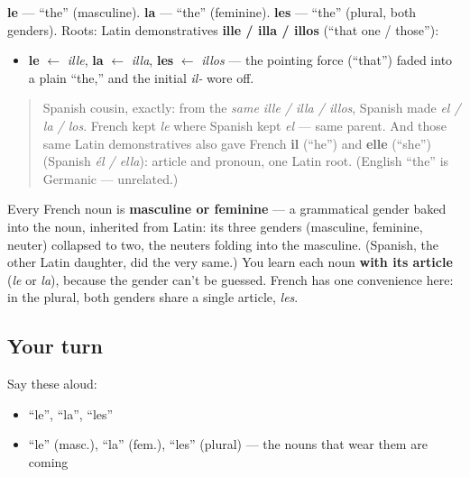 \begin{cousinweb}
\textbf{le} — \textquotedblleft{}the\textquotedblright{} (masculine). \textbf{la} — \textquotedblleft{}the\textquotedblright{} (feminine). \textbf{les} — \textquotedblleft{}the\textquotedblright{} (plural, both genders). Roots: Latin demonstratives \textbf{ille / illa / illos} (\textquotedblleft{}that one / those\textquotedblright{}):

\begin{itemize}
\raggedright
  \item \textbf{le} $\leftarrow$ \emph{ille}, \textbf{la} $\leftarrow$ \emph{illa}, \textbf{les} $\leftarrow$ \emph{illos} — the pointing force (\textquotedblleft{}that\textquotedblright{}) faded into a plain \textquotedblleft{}the,\textquotedblright{} and the initial \emph{il-} wore off.
\end{itemize}

\begin{quote}
Spanish cousin, exactly: from the \emph{same ille / illa / illos}, Spanish made \emph{el / la / los}. French kept \emph{le} where Spanish kept \emph{el} — same parent. And those same Latin demonstratives also gave French \textbf{il} (\textquotedblleft{}he\textquotedblright{}) and \textbf{elle} (\textquotedblleft{}she\textquotedblright{}) (Spanish \emph{él / ella}): article and pronoun, one Latin root. (English \textquotedblleft{}the\textquotedblright{} is Germanic — unrelated.)
\end{quote}
\end{cousinweb}

\begin{grammarlens}[title={Grammar Lens: French gender, also from Latin}]
Every French noun is \textbf{masculine or feminine} — a grammatical gender baked into the noun, inherited from Latin: its three genders (masculine, feminine, neuter) collapsed to two, the neuters folding into the masculine. (Spanish, the other Latin daughter, did the very same.) You learn each noun \textbf{with its article} (\emph{le} or \emph{la}), because the gender can't be guessed. French has one convenience here: in the plural, both genders share a single article, \emph{les}.
\end{grammarlens}

\subsection*{Your turn}
Say these aloud:

\begin{itemize}
\raggedright
  \item \textquotedblleft{}le\textquotedblright{}, \textquotedblleft{}la\textquotedblright{}, \textquotedblleft{}les\textquotedblright{}
  \item \textquotedblleft{}le\textquotedblright{} (masc.), \textquotedblleft{}la\textquotedblright{} (fem.), \textquotedblleft{}les\textquotedblright{} (plural) — the nouns that wear them are coming
\end{itemize}

